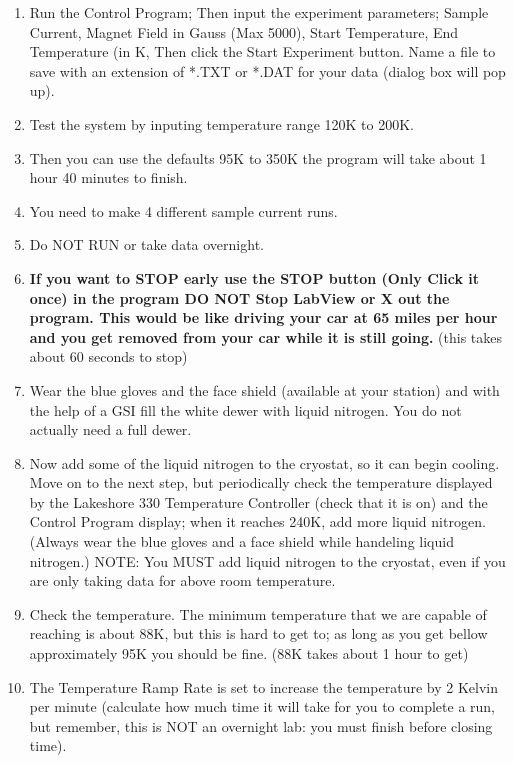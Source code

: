 \documentclass{../lab}
\begin{document}
\begin{enumerate}
    \item Run the Control Program; Then input the experiment parameters; Sample Current, Magnet Field in Gauss (Max 5000), Start Temperature, End Temperature (in K, Then click the Start Experiment button. Name a file to save with an extension of *.TXT or *.DAT for your data (dialog box will pop up).

    \item Test the system by inputing temperature range 120K to 200K.

    \item Then you can use the defaults 95K to 350K the program will take about 1 hour 40 minutes to finish.

    \item You need to make 4 different sample current runs.

    \item Do NOT RUN or take data overnight.

    \item \textbf{If you want to STOP early use the STOP button (Only Click it once) in the program DO NOT Stop LabView or X out the program. This would be like driving your car at 65 miles per hour and you get removed from your car while it is still going.} (this takes about 60 seconds to stop)

    \item Wear the blue gloves and the face shield (available at your station) and with the help of a GSI fill the white dewer with liquid nitrogen. You do not actually need a full dewer.

    \item Now add some of the liquid nitrogen to the cryostat, so it can begin cooling. Move on to the next step, but periodically check the temperature displayed by the Lakeshore 330 Temperature Controller (check that it is on) and the Control Program display; when it reaches 240K, add more liquid nitrogen. (Always wear the blue gloves and a face shield while handeling liquid nitrogen.) NOTE: You MUST add liquid nitrogen to the cryostat, even if you are only taking data for above room temperature.

    \item Check the temperature. The minimum temperature that we are capable of reaching is about 88K, but this is hard to get to; as long as you get bellow approximately 95K you should be fine. (88K takes about 1 hour to get)

    \item The Temperature Ramp Rate is set to increase the temperature by 2 Kelvin per minute (calculate how much time it will take for you to complete a run,  but remember, this is NOT an overnight lab: you must finish before closing time).


\end{enumerate}
\end{document}
